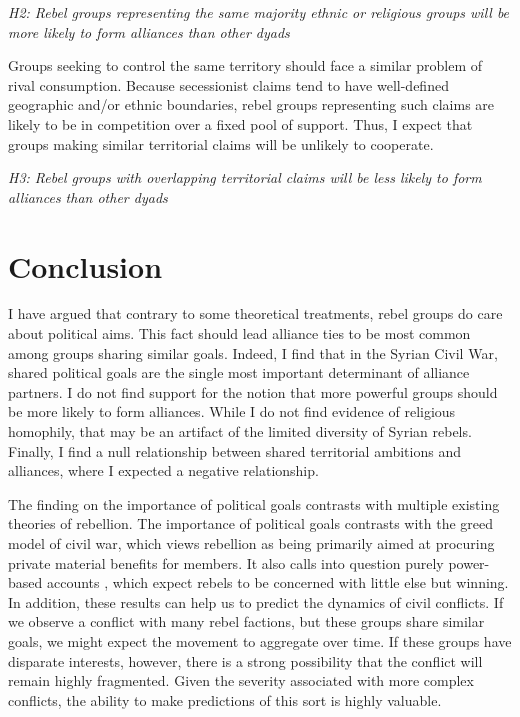 \documentclass[12pt,]{book}
\begin{document}
\emph{H2: Rebel groups representing the same majority ethnic or
religious groups will be more likely to form alliances than other dyads}

Groups seeking to control the same territory should face a similar
problem of rival consumption. Because secessionist claims tend to have
well-defined geographic and/or ethnic boundaries, rebel groups
representing such claims are likely to be in competition over a fixed
pool of support. Thus, I expect that groups making similar territorial
claims will be unlikely to cooperate.

\emph{H3: Rebel groups with overlapping territorial claims will be less
likely to form alliances than other dyads}

\section{Conclusion}\label{conclusion-1}

I have argued that contrary to some theoretical treatments, rebel groups
do care about political aims. This fact should lead alliance ties to be
most common among groups sharing similar goals. Indeed, I find that in
the Syrian Civil War, shared political goals are the single most
important determinant of alliance partners. I do not find support for
the notion that more powerful groups should be more likely to form
alliances. While I do not find evidence of religious homophily, that may
be an artifact of the limited diversity of Syrian rebels. Finally, I
find a null relationship between shared territorial ambitions and
alliances, where I expected a negative relationship.

The finding on the importance of political goals contrasts with multiple
existing theories of rebellion. The importance of political goals
contrasts with the greed model of civil war, which views rebellion as
being primarily aimed at procuring private material benefits for
members. It also calls into question purely power-based accounts
\citep{Christia2012}, which expect rebels to be concerned with little
else but winning. In addition, these results can help us to predict the
dynamics of civil conflicts. If we observe a conflict with many rebel
factions, but these groups share similar goals, we might expect the
movement to aggregate over time. If these groups have disparate
interests, however, there is a strong possibility that the conflict will
remain highly fragmented. Given the severity associated with more
complex conflicts, the ability to make predictions of this sort is
highly valuable.
\end{document}

